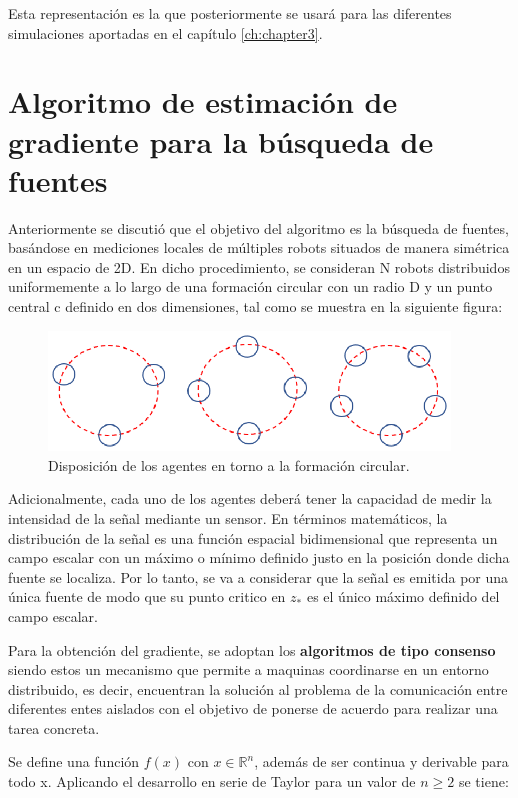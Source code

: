 Esta representación es la que posteriormente se usará para las diferentes simulaciones aportadas en el capítulo \ref{ch:chapter3}. 

\section{Algoritmo de estimación de gradiente para la búsqueda de fuentes} \label{Estima}

Anteriormente se discutió que el objetivo del algoritmo es la búsqueda de fuentes, basándose en mediciones locales de múltiples robots situados de manera simétrica en un espacio de 2D. En dicho procedimiento, se consideran N robots distribuidos uniformemente a lo largo de una formación circular con un radio D y un punto central c definido en dos dimensiones, tal como se muestra en la siguiente figura: \\

\begin{figure}[htb]
\centering
\includegraphics[width=0.95\textwidth]{figures/Disposicion_Robots.eps}
\caption{Disposición de los agentes en torno a la formación circular.} \label{Disp:Robots}
\end{figure}

Adicionalmente, cada uno de los agentes deberá tener la capacidad de medir la intensidad de la señal mediante un sensor. En términos matemáticos, la distribución de la señal es una función espacial bidimensional que representa un campo escalar con un máximo o mínimo definido justo en la posición donde dicha fuente se localiza. Por lo tanto, se va a considerar que la señal es emitida por una única fuente de modo que su punto critico en $z_*$ es el único máximo definido del campo escalar.

Para la obtención del gradiente, se adoptan los \textbf{algoritmos de tipo consenso} siendo estos un mecanismo que permite a maquinas coordinarse en un entorno distribuido, es decir, encuentran la solución al problema de la comunicación entre diferentes entes aislados con el objetivo de ponerse de acuerdo para realizar una tarea concreta.

Se define una función $f\left(x\right)$ con $x\in\mathbb{R}^{n}$, además de ser continua y derivable para todo x. Aplicando el desarrollo en serie de Taylor para un valor de $n\geq{2}$ se tiene:

